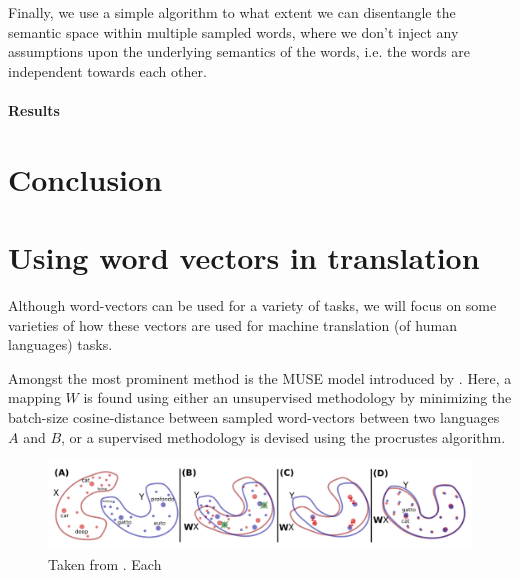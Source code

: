 \documentclass[a4paper,12pt,twoside,openright]{report}
\begin{document}
Finally, we use a simple algorithm to what extent we can disentangle the semantic space within multiple sampled words, where we don't inject any assumptions upon the underlying semantics of the words, i.e. the words are independent towards each other.


\subsubsection{Results}



\chapter{Conclusion}

\appendix
\singlespacing

%  

 

\chapter{Using word vectors in translation}\label{AppendixApplication}


Although word-vectors can be used for a variety of tasks, we will focus on some varieties of how these vectors are used for machine translation (of human languages) tasks.

Amongst the most prominent method is the MUSE model introduced by \cite{conneau17}.
Here, a mapping $W$ is found using either an unsupervised methodology by minimizing the batch-size cosine-distance between sampled word-vectors between two languages $A$ and $B$, or a supervised methodology is devised using the procrustes algorithm.

\begin{figure}[h]
	\center
  \includegraphics[width=\linewidth]{./assets/relatedwork/muse.png}
  \caption{Taken from \cite{conneau17}. Each }
  \label{fig:muse_translation}
\end{figure}
\end{document}
